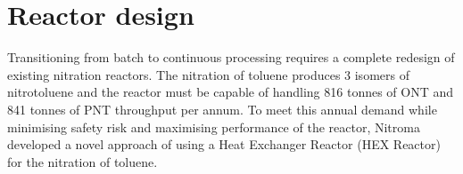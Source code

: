 \section*{Reactor design}
Transitioning from batch to continuous processing requires a complete redesign of existing nitration reactors. The nitration of toluene produces 3 isomers of nitrotoluene and the reactor must be capable of handling 816 tonnes of ONT and 841 tonnes of PNT throughput per annum. To meet this annual demand while minimising safety risk and maximising performance of the reactor, Nitroma developed a novel approach of using a Heat Exchanger Reactor (HEX Reactor) for the nitration of toluene.


